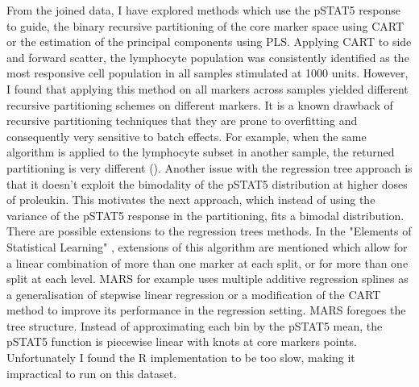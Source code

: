 From the joined data, I have explored methods which use the pSTAT5 response to guide, the binary recursive partitioning of the core marker space using \gls{CART} or the estimation of the principal components using \gls{PLS}.
Applying \gls{CART} to side and forward scatter, the lymphocyte population was consistently identified as the most responsive cell population in all samples stimulated at 1000 units.
However, I found that applying this method on all markers across samples yielded different recursive partitioning schemes on different markers.
It is a known drawback of recursive partitioning techniques that they are prone to overfitting and consequently very sensitive to batch effects.
For example, when the same algorithm is applied to the lymphocyte subset in another sample,
the returned partitioning is very different ().  
Another issue with the regression tree approach is that it doesn't exploit the bimodality of the pSTAT5 distribution at higher doses of proleukin. This motivates the next approach, which instead of using the variance of the pSTAT5 response in the partitioning,
fits a bimodal distribution.  
There are possible extensions to the regression trees methods.
In the "Elements of Statistical Learning" \citep{Anonymous:ikywRZeA},
extensions of this algorithm are mentioned which allow for a linear combination of more than one marker at each split,
or for more than one split at each level.
\gls{MARS} for example uses multiple additive regression splines as a generalisation of stepwise linear regression
or a modification of the CART method to improve its performance in the regression setting.
\gls{MARS} foregoes the tree structure.
Instead of approximating each bin by the pSTAT5 mean, the pSTAT5 function is piecewise linear with knots at core markers
points.
Unfortunately I found the R implementation to be too slow, making it impractical to run on this dataset.
